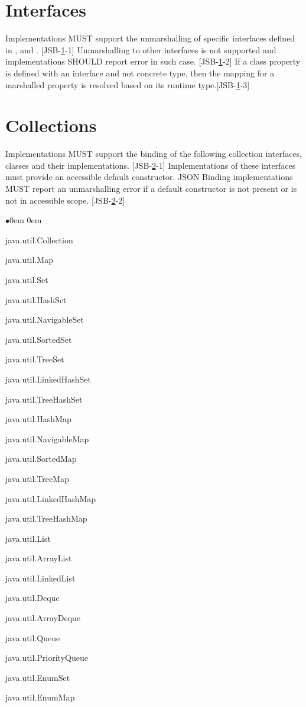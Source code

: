 \section{Interfaces}
\label{sec:interfaces}
Implementations MUST support the unmarshalling of specific interfaces defined in  , and . [JSB-\ref{sec:interfaces}-1] 
Unmarshalling to other interfaces is not supported and implementations SHOULD report error in such case. [JSB-\ref{sec:interfaces}-2] 
If a class property is defined with an interface and not concrete type, then the mapping for a marshalled property is resolved based on its runtime type.[JSB-\ref{sec:interfaces}-3]

\section{Collections}
\label{sec:collections}
Implementations MUST support the binding of the following collection interfaces, classes and their implementations. [JSB-\ref{sec:collections}-1] 
Implementations of these interfaces must provide an accessible default constructor. JSON Binding implementations MUST report an unmarshalling error if a default constructor is not present or is not in accessible scope. [JSB-\ref{sec:collections}-2]

\begin{list}{$\bullet$}{\parsep 0em  0em}
\item java.util.Collection
\item java.util.Map
\item java.util.Set
\item java.util.HashSet
\item java.util.NavigableSet
\item java.util.SortedSet
\item java.util.TreeSet
\item java.util.LinkedHashSet
\item java.util.TreeHashSet
\item java.util.HashMap
\item java.util.NavigableMap
\item java.util.SortedMap
\item java.util.TreeMap
\item java.util.LinkedHashMap
\item java.util.TreeHashMap
\item java.util.List
\item java.util.ArrayList
\item java.util.LinkedList
\item java.util.Deque
\item java.util.ArrayDeque
\item java.util.Queue
\item java.util.PriorityQueue
\item java.util.EnumSet
\item java.util.EnumMap
\end{list}

